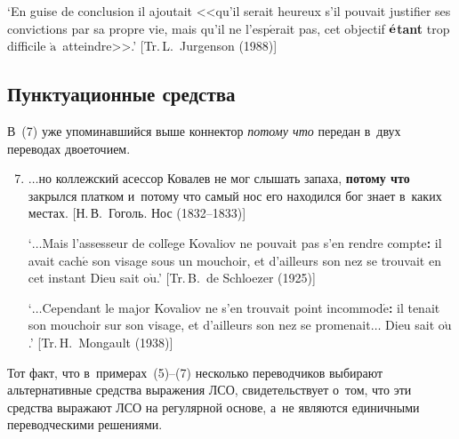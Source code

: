 \begin{multicols}{2}
{\begin{enumerate}[(1)]
`En guise de conclusion il ajoutait <<qu'il serait heureux s'il pouvait justifier ses convictions 
par sa propre vie, mais qu'il ne l'esp$\acute{\mbox{e}}$rait pas, cet objectif 
$\acute{\mbox{\textbf{e}}}$\textbf{tant} trop difficile $\grave{\mbox{a}}$~atteindre>>.' 
[Tr.\,L.~Jurgenson (1988)]
\end{enumerate}
}

\subsection{Пунктуационные средства}

В~(7) уже упоминавшийся выше коннектор \textit{потому что} передан 
в~двух переводах двоеточием.
{\small
\begin{enumerate}[(1)]
\setcounter{enumi}{6}
\item
$\ldots$но коллежский асессор Ковалев не мог слышать запаха, \textbf{потому что} 
закрылся платком и~потому что самый нос его находился бог знает в~каких местах. 
[Н.\,В.~Гоголь. Нос (1832--1833)]

`$\ldots$Mais l'assesseur de coll$\grave{\mbox{e}}$ge Kovaliov ne pouvait pas s'en rendre 
compte\textbf{:} il avait cach$\acute{\mbox{e}}$ son visage sous un mouchoir, et d'ailleurs son nez 
se trouvait en cet instant Dieu sait o$\grave{\mbox{u}}$.' [Tr.\,B.~de Schloezer (1925)]

`$\ldots$Cependant le major Kovaliov ne s'en trouvait point incommod$\acute{\mbox{e}}$\textbf{:} 
il tenait son mouchoir sur son visage, et d'ailleurs son nez se promenait$\ldots$ Dieu sait 
o$\grave{\mbox{u}}$.' [Tr.\,H.~Mongault (1938)]
\end{enumerate}
}

Тот факт, что в~примерах~(5)--(7) несколько переводчиков выбирают 
альтернативные средства выражения ЛСО, свидетельствует о~том, что эти 
средства выражают ЛСО на регулярной основе, а~не являются единичными 
переводческими ре\-ше\-ни\-ями.
{

}

\begin{table*}[b]\small %
\begin{center}
\vspace*{2ex}


\end{center}
\end{table*}
\end{multicols}
